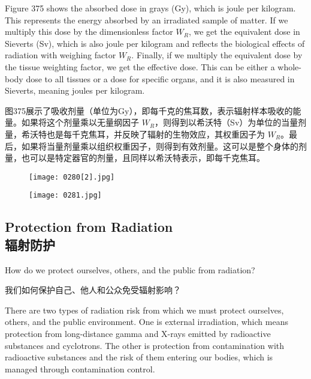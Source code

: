 \documentclass[dvipsnames, svgnames,a4paper,11pt]{article}
\begin{document}
Figure 375 shows the absorbed dose in grays (Gy), which is joule per kilogram. This represents the energy absorbed by an irradiated sample of matter. If we multiply this dose by the dimensionless factor \(W_R\), we get the equivalent dose in Sieverts (Sv), which is also joule per kilogram and reflects the biological effects of radiation with weighing factor \(W_R\). Finally, if we multiply the equivalent dose by the tissue weighting factor, we get the effective dose. This can be either a whole-body dose to all tissues or a dose for specific organs, and it is also measured in Sieverts, meaning joules per kilogram.

图375展示了吸收剂量（单位为Gy），即每千克的焦耳数，表示辐射样本吸收的能量。如果将这个剂量乘以无量纲因子 \(W_R\)，则得到以希沃特（Sv）为单位的当量剂量，希沃特也是每千克焦耳，并反映了辐射的生物效应，其权重因子为 \(W_R\)。最后，如果将当量剂量乘以组织权重因子，则得到有效剂量。这可以是整个身体的剂量，也可以是特定器官的剂量，且同样以希沃特表示，即每千克焦耳。

\begin{figure}[h]
    \centering
    \texttt{[image: 0280[2].jpg]}  
     \label{fig374}
\end{figure}

\begin{figure}[H]
    \centering
    \texttt{[image: 0281.jpg]}  
     \label{fig375}
\end{figure}

\subsection{Protection from Radiation \\辐射防护}

How do we protect ourselves, others, and the public from radiation?

我们如何保护自己、他人和公众免受辐射影响？

There are two types of radiation risk from which we must protect ourselves, others, and the public environment. One is external irradiation, which means protection from long-distance gamma and X-rays emitted by radioactive substances and cyclotrons. The other is protection from contamination with radioactive substances and the risk of them entering our bodies, which is managed through contamination control.
\end{document}
